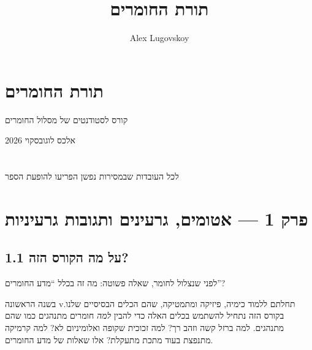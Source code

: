 \documentclass[
  hebrew,
  letterpaper,
  DIV=11,
  numbers=noendperiod]{scrreprt}
\title{תורת החומרים}
\author{Alex Lugovskoy}
\date{}
\renewcommand*\contentsname{תוכן עניינים}
\newcommand\contentsname{תוכן עניינים}
\begin{document}
\maketitle

\renewcommand*\contentsname{תוכן עניינים}
{
\setcounter{tocdepth}{2}
\tableofcontents
}


\chapter{תורת
החומרים}\label{ux5eaux5d5ux5e8ux5ea-ux5d4ux5d7ux5d5ux5deux5e8ux5d9ux5dd}

קורס לסטודנטים של מסלול החומרים

אלכס לוגובסקוי 2026


\chapter{}\label{section}

לכל העובדות שבמסירות נפשן הפריעו להופעת הספר


\chapter{}\label{section-1}


\chapter{פרק 1 --- אטומים, גרעינים ותגובות
גרעיניות}\label{ux5e4ux5e8ux5e7-1-ux5d0ux5d8ux5d5ux5deux5d9ux5dd-ux5d2ux5e8ux5e2ux5d9ux5e0ux5d9ux5dd-ux5d5ux5eaux5d2ux5d5ux5d1ux5d5ux5ea-ux5d2ux5e8ux5e2ux5d9ux5e0ux5d9ux5d5ux5ea}

\section{1.1 על מה הקורס
הזה?}\label{ux5e2ux5dc-ux5deux5d4-ux5d4ux5e7ux5d5ux5e8ux5e1-ux5d4ux5d6ux5d4}

לפני שנצלול לחומר, שאלה פשוטה: מה זה בכלל ``מדע החומרים''?

בשנה הראשונה vתחלתם ללמוד כימיה, פיזיקה ומתמטיקה, שהם הכלים הבסיסיים
שלנו. בקורס הזה נתחיל להשתמש בכלים האלה כדי להבין \emph{למה} חומרים
מתנהגים כמו שהם מתנהגים. למה ברזל קשה וזהב רך? למה זכוכית שקופה
ואלומיניום לא? למה קרמיקה מתנפצת בעוד מתכת מתעקלת? אלו שאלות של מדע
החומרים.
\end{document}

